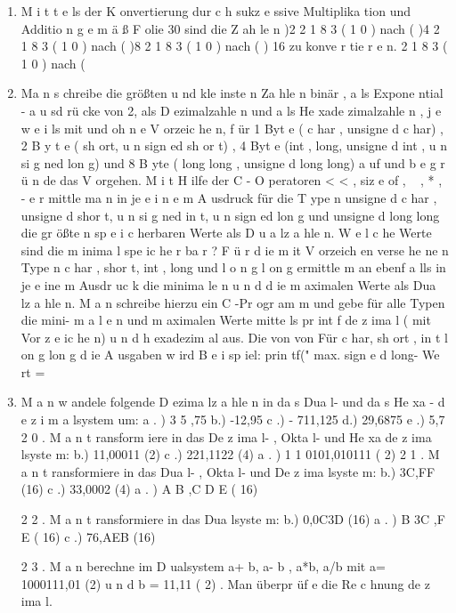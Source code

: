 \documentclass[12pt,a4paper]{scrreprt}
\begin{document}
\begin{enumerate}
\item M i t t e ls der K onvertierung dur c h sukz e ssive Multiplika tion und Additio n
g e m ä ß F olie 30 sind die Z ah le n
)2
2 1 8 3 ( 1 0 ) nach (
)4
2 1 8 3 ( 1 0 ) nach (
)8
2 1 8 3 ( 1 0 ) nach (
) 16 zu konve r tie r e n.
2 1 8 3 ( 1 0 ) nach (

\item Ma n s chreibe die größten u nd kle inste n Za hle n binär , a ls Expone ntial -
a u sd rü cke von 2, als D ezimalzahle n und a ls He xade zimalzahle n ,
j e w e i ls mit und oh n e V orzeic he n, f ür 1 Byt e ( c har , unsigne d c har) ,
2 B y t e ( sh ort, u n sign ed sh or t) , 4 Byt e (int , long, unsigne d int ,
u n si g ned lon g) und 8 B yte ( long long , unsigne d long long) a uf und
b e g r ü n de das V orgehen.
M i t H ilfe der C - O peratoren < < , siz e of , ~ , * , - e r mittle ma n in je
e i n e m A usdruck für die T ype n unsigne d c har , unsigne d shor t,
u n si g ned in t, u n sign ed lon g und unsigne d long long die gr ößte n
sp e i c herbaren Werte als D u a lz a hle n.
W e l c he Werte sind die m inima l spe ic he r ba r ?
F ü r d ie m it V orzeich en verse he ne n Type n c har , shor t, int , long und
l o n g l on g ermittle m an ebenf a lls in je e ine m Ausdr uc k die minima le n
u n d d ie m aximalen Werte als Dua lz a hle n.
M a n schreibe hierzu ein C -Pr ogr am m und gebe für alle Typen die mini-
m a l e n und m aximalen Werte mitte ls pr int f de z ima l ( mit Vor z e ic he n)
u n d h exadezim al aus.
Die
von
von
Für
c har, sh ort , in t %
l on g lon g %
d ie A usgaben w ird %
B e i sp iel: prin tf(" max. sign e d long- We rt = %

\item M a n w andele folgende D ezima lz a hle n in da s Dua l- und da s He xa -
d e z i m a lsystem um:
a . ) 3 5 ,75
b.) -12,95
c .) - 711,125
d.) 29,6875
e .) 5,7
2 0 . M a n t ransform iere in das De z ima l- , Okta l- und He xa de z ima lsyste m:
b.) 11,00011 (2)
c .) 221,1122 (4)
a . ) 1 1 0101,010111 ( 2)
2 1 . M a n t ransformiere in das Dua l- , Okta l- und De z ima lsyste m:
b.) 3C,FF (16)
c .) 33,0002 (4)
a . ) A B ,C D E ( 16)

2 2 . M a n t ransformiere in das Dua lsyste m:
b.) 0,0C3D (16)
a . ) B 3C ,F E ( 16)
c .) 76,AEB (16)

2 3 . M a n berechne im D ualsystem a+ b, a- b , a*b, a/b mit a= 1000111,01 (2)
u n d b = 11,11 ( 2) . Man überpr üf e die Re c hnung de z ima l.


\end{enumerate}
\end{document}
